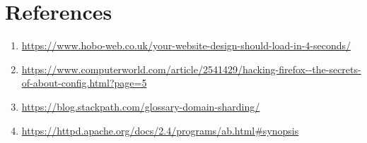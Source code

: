 \documentclass[a4paper,10pt]{article}
\begin{document}
\clearpage


\section{References}

\begin{enumerate}

\item \label{article1} \url{https://www.hobo-web.co.uk/your-website-design-should-load-in-4-seconds/} 

\item \label{article2} \url{https://www.computerworld.com/article/2541429/hacking-firefox--the-secrets-of-about-config.html?page=5} 

\item \label{article3} \url{https://blog.stackpath.com/glossary-domain-sharding/} 


\item \label{article4} \url{https://httpd.apache.org/docs/2.4/programs/ab.html#synopsis} 



\end{enumerate}
\end{document}
